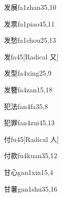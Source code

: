 \begin{verbete}{发展}{fa1zhan3}{5,10}
\end{verbete}

\begin{verbete}{发票}{fa1piao4}{5,11}
\end{verbete}

\begin{verbete}{发愁}{fa1chou2}{5,13}
\end{verbete}

\begin{verbete}{发}{fa4}{5}[Radical ⼜]
\end{verbete}

\begin{verbete}{发型}{fa4xing2}{5,9}
\end{verbete}

\begin{verbete}{发簪}{fa4zan1}{5,18}
\end{verbete}

\begin{verbete}{犯法}{fan4fa3}{5,8}
\end{verbete}

\begin{verbete}{犯罪}{fan4zui4}{5,13}
\end{verbete}

\begin{verbete}{付}{fu4}{5}[Radical 人]
\end{verbete}

\begin{verbete}{付款}{fu4kuan3}{5,12}
\end{verbete}

\begin{verbete}{甘心}{gan1xin1}{5,4}
\end{verbete}

\begin{verbete}{甘薯}{gan1shu3}{5,16}
\end{verbete}

